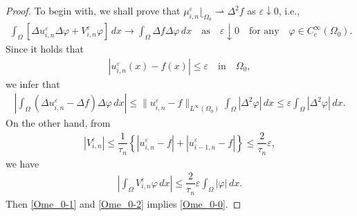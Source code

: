 \documentclass[12pt]{amsart}
\begin{document}
\begin{proof} 
To begin with, we shall prove that $\mu^{\varepsilon}_{i,n} \lfloor_{\Omega_0} \rightharpoonup \Delta^2 f$ as ${\varepsilon} \downarrow 0$, i.e., 
\begin{align} \label{Ome_0-0}
\int_\Omega \left[ \Delta u^{\varepsilon}_{i,n} \Delta {\varphi} + V^{\varepsilon}_{i,n} {\varphi} \right] \, dx 
\to \int_\Omega \Delta f \Delta {\varphi} \, dx \quad \text{as} \quad {\varepsilon} \downarrow 0 
\quad \text{for any} \quad {\varphi} \in C^{\infty}_{c}(\Omega_0) . 
\end{align}
Since it holds that 
\begin{align*}
{\left| {u^{\varepsilon}_{i,n}(x) - f(x)} \right|} \le {\varepsilon} \quad \text{in} \quad \Omega_0, 
\end{align*}
we infer that 
\begin{align} \label{Ome_0-1}
{\left| {\int_\Omega \left( \Delta u^{\varepsilon}_{i,n} - \Delta f \right)\Delta {\varphi} \, dx } \right|} 
 \le \| u^{\varepsilon}_{i,n} - f \|_{L^\infty(\Omega_0)} \int_\Omega {\left| {\Delta^2 {\varphi}} \right|} \, dx 
 \le {\varepsilon} \int_\Omega {\left| {\Delta^2 {\varphi}} \right|} \, dx. 
\end{align}
On the other hand, from 
\begin{align*}
{\left| {V^{\varepsilon}_{i,n}} \right|} 
 \le \dfrac{1}{\tau_n} \left\{ {\left| {u^{\varepsilon}_{i,n} - f} \right|} + {\left| {u^{\varepsilon}_{i-1,n} - f} \right|} \right\} \le \dfrac{2}{\tau_n} {\varepsilon}, 
\end{align*}
we have 
\begin{align} \label{Ome_0-2}
{\left| {\int_\Omega V^{\varepsilon}_{i,n} {\varphi} \, dx} \right|} 
 \le \dfrac{2}{\tau_n} {\varepsilon} \int_\Omega {\left| {\varphi} \right|}\, dx. 
\end{align}
Then \eqref{Ome_0-1} and \eqref{Ome_0-2} implies \eqref{Ome_0-0}. 


\end{proof}
\end{document}
